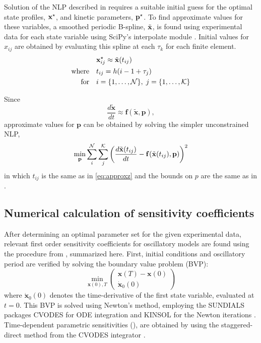 Solution of the NLP described in  requires a suitable initial guess for the optimal state profiles, ${\mathbf{x}}^\star$, and kinetic parameters, ${\mathbf{p}}^\star$. 
To find approximate values for these variables, a smoothed periodic B-spline, $\tilde{\mathbf{x}}$, is found using experimental data for each state variable using SciPy's interpolate module \cite{Jones}. 
Initial values for $x_{ij}$ are obtained by evaluating this spline at each $\tau_k$ for each finite element.
\begin{equation} \label{eq:approxz}
  \begin{aligned} &{\mathbf{x}}^\star_{ij} \approx \tilde{\mathbf{x}}(t_{ij}) \\ 
    \textrm{where} \quad & t_{ij} = h(i - 1 + \tau_j) \\
    \textrm{for} \quad & i = \{1,\ldots,{\cal N}\},\; j = \{1,\ldots,{\cal K}\}
  \end{aligned}
\end{equation}

Since
\begin{equation}
  \frac{d\tilde{\bm x}}{dt} \approx {\bm f}(\tilde{\bm x},{\bm p}),
\end{equation}
approximate values for $\bm p$ can be obtained by solving the simpler unconstrained NLP,
\begin{equation}
  \min_{\mathbf{p}} \sum_i^{{\cal N}}\sum_j^{{\cal K}}\left(\frac{d\tilde{\mathbf{x}}(t_{ij})}{dt} - {\mathbf{f}}(\tilde{\mathbf{x}}(t_{ij}),{\mathbf{p}})\right)^2
\end{equation}
in which $t_{ij}$ is the same as in \ref{eq:approxz} and the bounds on $p$ are the same as in .

\subsection{Numerical calculation of sensitivity coefficients}

After determining an optimal parameter set for the given experimental data, relevant first order sensitivity coefficients for oscillatory models are found using the procedure from \cite{Wilkins2009}, summarized here. 
First, initial conditions and oscillatory period are verified by solving the boundary value problem (BVP):
\begin{equation} \label{eq:bvp}
  \min_{{\bm x}(0),T} \left(\begin{array}{c} {\bm x}(T) - {\bm x}(0) \\ \dot{{\bm x}}_0(0)
  \end{array}\right)     
\end{equation}
where $\dot{{\bm x}}_0(0)$ denotes the time-derivative of the first state variable, evaluated at $t=0$. 
This BVP is solved using Newton's method, employing the SUNDIALS packages CVODES for ODE integration and KINSOL for the Newton iterations \cite{Hindmarsh2005}.
Time-dependent parametric sensitivities (), are obtained by using the staggered-direct method from the CVODES integrator \cite{Serban2005}. 

